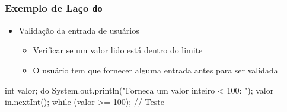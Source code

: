 \documentclass[xcolor={dvipsnames,table},aspectratio=169]{beamer}
\begin{document}
\begin{frame}[fragile]\frametitle{Exemplo de Laço \texttt{do}}
\begin{itemize}
	\item Validação da entrada de usuários
	\begin{itemize}
		\item Verificar se um valor lido está dentro do limite
		\item O usuário tem que fornecer alguma entrada antes para ser validada 
	\end{itemize}
\end{itemize}
\begin{javacode}
int valor;
do {
   System.out.println("Forneca um valor inteiro < 100: "); 
   valor = in.nextInt();
}  while (valor >= 100);  // Teste
\end{javacode}
\end{frame}
\end{document}
